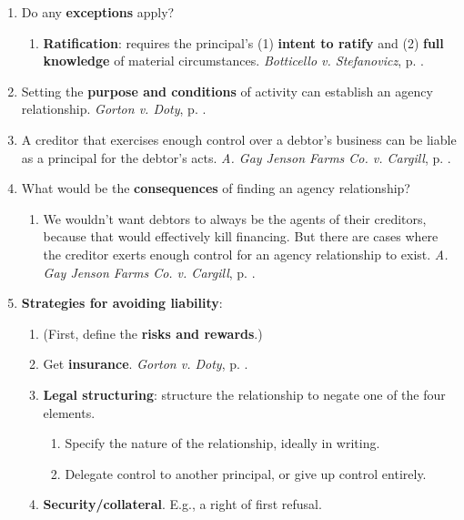 \begin{enumerate}
\begin{enumerate}
        \pageref{par:mill}.)
    \end{enumerate}
    \item Do any \textbf{exceptions} apply?
    \begin{enumerate}
        \item \textbf{Ratification}: requires the principal's (1) 
        \textbf{intent to ratify} and (2) \textbf{full knowledge} of material 
        circumstances. \emph{Botticello v. Stefanovicz}, p. 
        \pageref{par:botticello}.
    \end{enumerate}
    \item Setting the \textbf{purpose and conditions} of activity can 
    establish an agency relationship. \emph{Gorton v. Doty}, p. 
    \pageref{subsub:gorton}.
    \item A creditor that exercises enough control over a debtor's business 
    can be liable as a principal for the debtor's acts. \emph{A. Gay Jenson 
    Farms Co. v. Cargill}, p. \pageref{subsub:cargill}.
    \item What would be the \textbf{consequences} of finding an agency 
    relationship?
    \begin{enumerate}
        \item We wouldn't want debtors to always be the agents of their 
        creditors, because that would effectively kill financing. But there 
        are cases where the creditor exerts enough control for an agency 
        relationship to exist. \emph{A. Gay Jenson Farms Co. v. Cargill}, p. 
        \pageref{subsub:cargill}.
    \end{enumerate}
    \item \textbf{Strategies for avoiding liability}:
    \begin{enumerate}
        \item (First, define the \textbf{risks and rewards}.)
        \item Get \textbf{insurance}. \emph{Gorton v. Doty}, p.
        \pageref{subsub:gorton}.
        \item \textbf{Legal structuring}: structure the relationship to negate 
        one of the four elements.
        \begin{enumerate}
            \item Specify the nature of the relationship, ideally in writing.
            \item Delegate control to another principal, or give up control 
            entirely.
        \end{enumerate}
        \item \textbf{Security/collateral}. E.g., a right of first refusal. 

\end{enumerate}
\end{enumerate}
